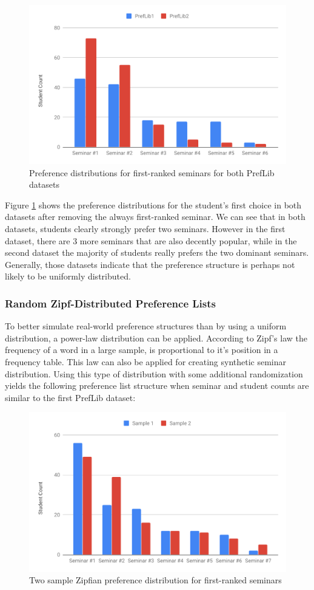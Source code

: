 \begin{figure}[h!]
    \centering
    \includegraphics[width=0.8\linewidth]{assets/plots/prelib-distr.pdf}
    \caption{Preference distributions for first-ranked seminars for both PrefLib datasets}
    \label{fig:preflib-distribution}
\end{figure}

Figure \ref{fig:preflib-distribution} shows the preference distributions for the student's first choice in both datasets after removing the always first-ranked seminar. We can see that in both datasets, students clearly strongly prefer two seminars. However in the first dataset, there are 3 more seminars that are also decently popular, while in the second dataset the majority of students really prefers the two dominant seminars. Generally, those datasets indicate that the preference structure is perhaps not likely to be uniformly distributed.

\subsubsection{Random Zipf-Distributed Preference Lists}
To better simulate real-world preference structures than by using a uniform distribution, a power-law distribution can be applied. According to Zipf's law the frequency of a word in a large sample, is proportional to it's position in a frequency table. This law can also be applied for creating synthetic seminar distribution. Using this type of distribution with some additional randomization yields the following preference list structure when seminar and student counts are similar to the first PrefLib dataset:

  \begin{figure}[h!]
    \centering
    \includegraphics[width=0.8\linewidth]{assets/plots/zipfian-distr.pdf}
    \caption{Two sample Zipfian preference distribution for first-ranked seminars}
    \label{fig:zipfian-distribution}
\end{figure}

